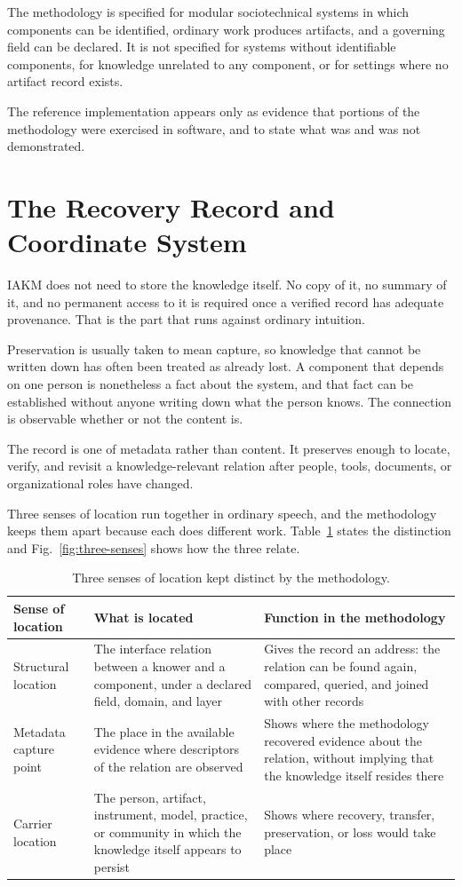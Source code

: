 \documentclass[preprints,article,submit,moreauthors]{Definitions/mdpi}
\begin{document}
The methodology is specified for modular sociotechnical systems in which components can be identified, ordinary work produces artifacts, and a governing field can be declared. It is not specified for systems without identifiable components, for knowledge unrelated to any component, or for settings where no artifact record exists.

The reference implementation appears only as evidence that portions of the methodology were exercised in software, and to state what was and was not demonstrated.

\section{The Recovery Record and Coordinate System}\label{sec:5}

IAKM does not need to store the knowledge itself. No copy of it, no summary of it, and no permanent access to it is required once a verified record has adequate provenance. That is the part that runs against ordinary intuition.

Preservation is usually taken to mean capture, so knowledge that cannot be written down has often been treated as already lost. A component that depends on one person is nonetheless a fact about the system, and that fact can be established without anyone writing down what the person knows. The connection is observable whether or not the content is.

The record is one of metadata rather than content. It preserves enough to locate, verify, and revisit a knowledge-relevant relation after people, tools, documents, or organizational roles have changed.

Three senses of location run together in ordinary speech, and the methodology keeps them apart because each does different work. Table~\ref{tab:senses} states the distinction and Fig.~\ref{fig:three-senses} shows how the three relate.

\begin{table}[H]
\caption{Three senses of location kept distinct by the methodology.}
\label{tab:senses}
\centering
\scriptsize
\begin{tabularx}{\textwidth}{XXX}
\hline
\textbf{Sense of location} & \textbf{What is located} & \textbf{Function in the methodology} \\
\hline
Structural location & The interface relation between a knower and a component, under a declared field, domain, and layer & Gives the record an address: the relation can be found again, compared, queried, and joined with other records \\
Metadata capture point & The place in the available evidence where descriptors of the relation are observed & Shows where the methodology recovered evidence about the relation, without implying that the knowledge itself resides there \\
Carrier location & The person, artifact, instrument, model, practice, or community in which the knowledge itself appears to persist & Shows where recovery, transfer, preservation, or loss would take place \\
\hline
\end{tabularx}
\end{table}
\end{document}
